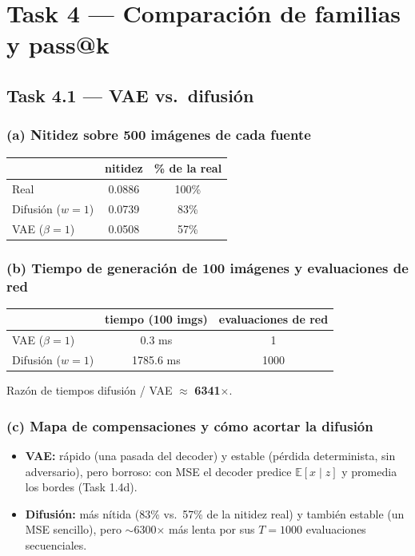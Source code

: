 \documentclass[11pt]{article}
\begin{document}
\section*{Task 4 --- Comparación de familias y pass@k}

\subsection*{Task 4.1 --- VAE vs.\ difusión}

\subsubsection*{(a) Nitidez sobre 500 imágenes de cada fuente}
\begin{table}[H]
\centering
\begin{tabular}{lcc}
\toprule
 & nitidez & \% de la real \\
\midrule
Real & 0.0886 & 100\% \\
Difusión ($w=1$) & 0.0739 & 83\% \\
VAE ($\beta=1$) & 0.0508 & 57\% \\
\bottomrule
\end{tabular}
\end{table}

\subsubsection*{(b) Tiempo de generación de 100 imágenes y evaluaciones de red}
\begin{table}[H]
\centering
\begin{tabular}{lcc}
\toprule
 & tiempo (100 imgs) & evaluaciones de red \\
\midrule
VAE ($\beta=1$) & 0.3 ms & 1 \\
Difusión ($w=1$) & 1785.6 ms & 1000 \\
\bottomrule
\end{tabular}
\end{table}
Razón de tiempos difusión / VAE $\approx$ \textbf{6341$\times$}.

\subsubsection*{(c) Mapa de compensaciones y cómo acortar la difusión}
\begin{itemize}
  \item \textbf{VAE:} rápido (una pasada del decoder) y estable (pérdida determinista, sin adversario), pero borroso: con MSE el decoder predice $\mathbb E[x\mid z]$ y promedia los bordes (Task 1.4d).
  \item \textbf{Difusión:} más nítida (83\% vs.\ 57\% de la nitidez real) y también estable (un MSE sencillo), pero $\sim$6300$\times$ más lenta por sus $T=1000$ evaluaciones secuenciales.
\end{itemize}
\end{document}
